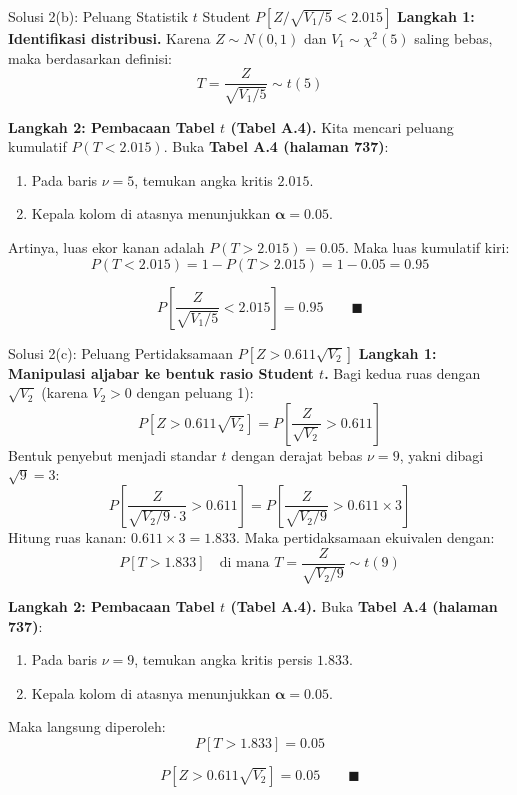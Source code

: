 \documentclass[10pt,twoside]{article}
\begin{document}
\begin{solbox}{Solusi 2(b): Peluang Statistik $t$ Student $P\left[Z / \sqrt{V_1 / 5} < 2.015\right]$}
\textbf{Langkah 1: Identifikasi distribusi.}
Karena $Z \sim N(0, 1)$ dan $V_1 \sim \chi^2(5)$ saling bebas, maka berdasarkan definisi:
\[
T = \frac{Z}{\sqrt{V_1 / 5}} \sim t(5)
\]

\textbf{Langkah 2: Pembacaan Tabel $t$ (Tabel A.4).}
Kita mencari peluang kumulatif $P(T < 2.015)$.
Buka \textbf{Tabel A.4 (halaman 737)}:
\begin{enumerate}
  \item Pada baris $\nu = 5$, temukan angka kritis $\mathbf{2.015}$.
  \item Kepala kolom di atasnya menunjukkan $\mathbf{\alpha = 0.05}$.
\end{enumerate}
Artinya, luas ekor kanan adalah $P(T > 2.015) = 0.05$. Maka luas kumulatif kiri:
\[
P(T < 2.015) = 1 - P(T > 2.015) = 1 - 0.05 = 0.95
\]

\[
\boxed{P\left[\frac{Z}{\sqrt{V_1 / 5}} < 2.015\right] = 0.95} \qquad \blacksquare
\]
\end{solbox}

\begin{solbox}{Solusi 2(c): Peluang Pertidaksamaan $P[Z > 0.611\sqrt{V_2}]$}
\textbf{Langkah 1: Manipulasi aljabar ke bentuk rasio Student $t$.}
Bagi kedua ruas dengan $\sqrt{V_2}$ (karena $V_2 > 0$ dengan peluang 1):
\[
P\left[Z > 0.611\sqrt{V_2}\right] = P\left[\frac{Z}{\sqrt{V_2}} > 0.611\right]
\]
Bentuk penyebut menjadi standar $t$ dengan derajat bebas $\nu = 9$, yakni dibagi $\sqrt{9} = 3$:
\[
P\left[\frac{Z}{\sqrt{V_2 / 9} \cdot 3} > 0.611\right] = P\left[\frac{Z}{\sqrt{V_2 / 9}} > 0.611 \times 3\right]
\]
Hitung ruas kanan: $0.611 \times 3 = 1.833$.
Maka pertidaksamaan ekuivalen dengan:
\[
P[T > 1.833] \quad \text{di mana } T = \frac{Z}{\sqrt{V_2 / 9}} \sim t(9)
\]

\textbf{Langkah 2: Pembacaan Tabel $t$ (Tabel A.4).}
Buka \textbf{Tabel A.4 (halaman 737)}:
\begin{enumerate}
  \item Pada baris $\nu = 9$, temukan angka kritis persis $\mathbf{1.833}$.
  \item Kepala kolom di atasnya menunjukkan $\mathbf{\alpha = 0.05}$.
\end{enumerate}
Maka langsung diperoleh:
\[
P[T > 1.833] = 0.05
\]

\[
\boxed{P[Z > 0.611\sqrt{V_2}] = 0.05} \qquad \blacksquare
\]
\end{solbox}
\end{document}
